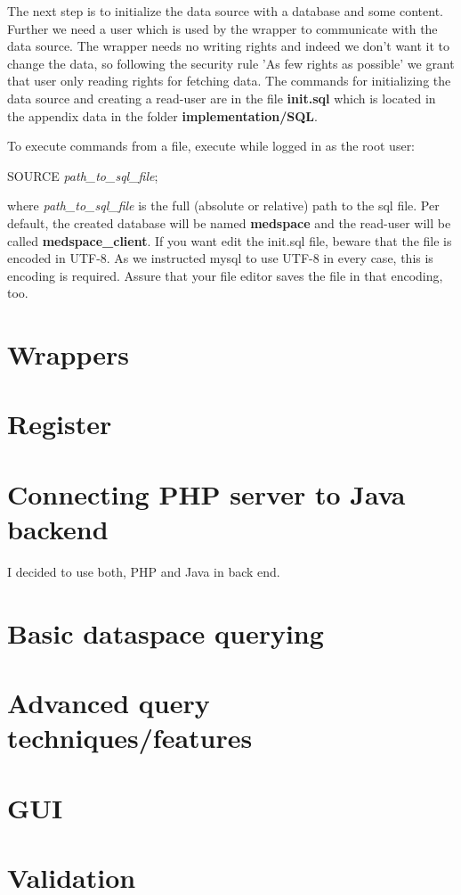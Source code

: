 The next step is to initialize the data source with a database and some content. Further we need a user which is used by the wrapper to communicate with the data source. The wrapper needs no writing rights and indeed we don't want it to change the data, so following the security rule 'As few rights as possible' we grant that user only reading rights for fetching data. The commands for initializing the data source and creating a read-user are in the file \textbf{init.sql} which is located in the appendix data in the folder \textbf{implementation/SQL}.

To execute commands from a file, execute while logged in as the root user:

\begin{codebox}
	SOURCE \emph{path\_to\_sql\_file};
\end{codebox}

where \emph{path\_to\_sql\_file} is the full (absolute or relative) path to the sql file.
Per default, the created database will be named \textbf{medspace} and the read-user will be called \textbf{medspace\_client}. If you want edit the init.sql file, beware that the file is encoded in UTF-8. As we instructed mysql to use UTF-8 in every case, this is encoding is required. Assure that your file editor saves the file in that encoding, too.


\section{Wrappers}
\section{Register}
\section{Connecting PHP server to Java backend}

I decided to use both, PHP and Java in back end. 

\section{Basic dataspace querying}
\section{Advanced query techniques/features}
\section{GUI}
\section{Validation}